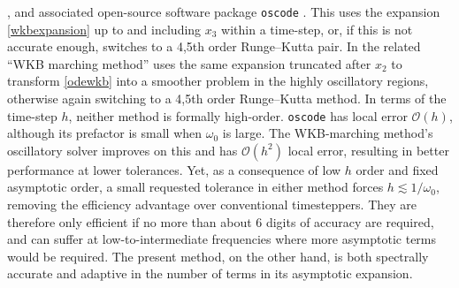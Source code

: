 \documentclass[10pt]{article}
\newcommand{\bigO}{{\mathcal O}}
\newcommand{\om}{\omega}
\newcommand{\g}{\gamma}
\newcommand{\AB}[1]{{\color{orange}#1}}
\begin{document}
\cite{agocs2020efficient,agocs2020dense}, and associated open-source software
package \texttt{oscode} \cite{agocs2020joss}. This uses the expansion
\cref{wkbexpansion} up to and including $x_3$ within a time-step,
or, if this is not accurate enough, switches to a 4,5th
order Runge--Kutta pair.
In \cite{arnold2011wkb,korner2022wkb} the related
``WKB marching method'' uses the same
expansion truncated after $x_2$ to transform \cref{odewkb} into a smoother
problem in the highly oscillatory regions,
otherwise again switching to a 4,5th order Runge--Kutta method.
%
In terms of the time-step $h$, neither method is formally high-order.
\texttt{oscode} has
local error $\bigO(h)$, although
its prefactor is small when $\om_0$ is large.
The
WKB-marching method's oscillatory solver improves on this and has $\bigO(h^2)$ local error, resulting in better performance at lower tolerances.
Yet, as a consequence of low $h$ order and fixed asymptotic order,
a small requested tolerance in either method forces
$h \lesssim 1/\om_0$, removing the efficiency advantage over conventional timesteppers.
They are therefore only efficient if no more than about 6 digits of accuracy
are required, and can suffer at low-to-intermediate frequencies where more asymptotic terms would be required.
The present method, on the other hand, is both spectrally accurate and 
adaptive in the number of terms in its asymptotic expansion.

\end{document}
